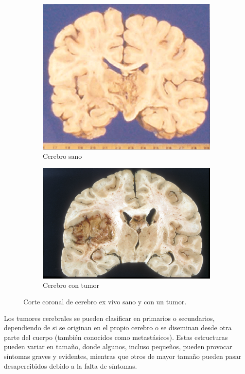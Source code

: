 \begin{figure}[H]
    \centering
    \begin{subfigure}[b]{0.45\linewidth}
        \centering
        \includegraphics[width=0.75\linewidth]{chapters/introduccion/images/normal.jpg}
        \caption{Cerebro sano}
    \end{subfigure}
    \hspace{0.5cm}
    \begin{subfigure}[b]{0.45\linewidth}
        \centering
        \includegraphics[width=\linewidth]{chapters/introduccion/images/tumor.jpg}
        \caption{Cerebro con tumor}
    \end{subfigure}
    \caption{Corte coronal de cerebro ex vivo sano y con un tumor.}
    \label{fig.cerebros}
\end{figure}

Los tumores cerebrales se pueden clasificar en primarios o secundarios, dependiendo de si se originan en el propio cerebro o se diseminan desde otra parte del cuerpo (también conocidos como metastásicos). Estas estructuras pueden variar en tamaño, donde algunos, incluso pequeños, pueden provocar síntomas graves y evidentes, mientras que otros de mayor tamaño pueden pasar desapercibidos debido a la falta de síntomas.

